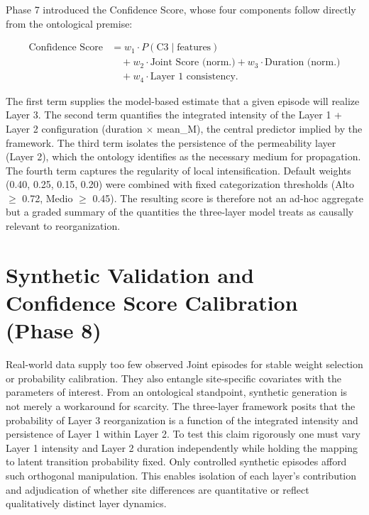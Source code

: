 \documentclass[11pt,a4paper]{article}
\begin{document}
Phase 7 introduced the Confidence Score, whose four components follow directly from the ontological premise:
\begin{sloppypar}
\[
\begin{aligned}
\text{Confidence Score} &= w_1 \cdot P(\text{C3} \mid \text{features}) \\
&\quad + w_2 \cdot \text{Joint Score (norm.)} + w_3 \cdot \text{Duration (norm.)} \\
&\quad + w_4 \cdot \text{Layer 1 consistency}.
\end{aligned}
\]
\end{sloppypar}
The first term supplies the model-based estimate that a given episode will realize Layer 3. The second term quantifies the integrated intensity of the Layer 1 + Layer 2 configuration (duration \(\times\) mean\_M), the central predictor implied by the framework. The third term isolates the persistence of the permeability layer (Layer 2), which the ontology identifies as the necessary medium for propagation. The fourth term captures the regularity of local intensification. Default weights (0.40, 0.25, 0.15, 0.20) were combined with fixed categorization thresholds (Alto $\geq$ 0.72, Medio $\geq$ 0.45). The resulting score is therefore not an ad-hoc aggregate but a graded summary of the quantities the three-layer model treats as causally relevant to reorganization.

\section{Synthetic Validation and Confidence Score Calibration (Phase 8)}

Real-world data supply too few observed Joint episodes for stable weight selection or probability calibration. They also entangle site-specific covariates with the parameters of interest. From an ontological standpoint, synthetic generation is not merely a workaround for scarcity. The three-layer framework posits that the probability of Layer 3 reorganization is a function of the integrated intensity and persistence of Layer 1 within Layer 2. To test this claim rigorously one must vary Layer 1 intensity and Layer 2 duration independently while holding the mapping to latent transition probability fixed. Only controlled synthetic episodes afford such orthogonal manipulation. This enables isolation of each layer's contribution and adjudication of whether site differences are quantitative or reflect qualitatively distinct layer dynamics.
\end{document}
